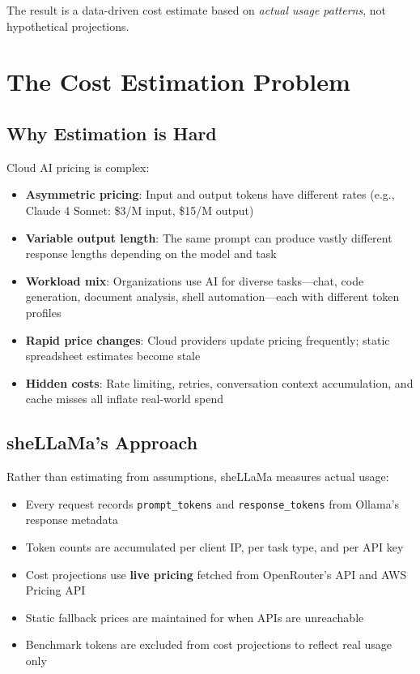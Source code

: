\documentclass[11pt,a4paper]{article}
\begin{document}
The result is a data-driven cost estimate based on \emph{actual usage patterns}, not hypothetical projections.

\section{The Cost Estimation Problem}

\subsection{Why Estimation is Hard}

Cloud AI pricing is complex:

\begin{itemize}
  \item \textbf{Asymmetric pricing}: Input and output tokens have different rates (e.g., Claude 4 Sonnet: \$3/M input, \$15/M output)
  \item \textbf{Variable output length}: The same prompt can produce vastly different response lengths depending on the model and task
  \item \textbf{Workload mix}: Organizations use AI for diverse tasks---chat, code generation, document analysis, shell automation---each with different token profiles
  \item \textbf{Rapid price changes}: Cloud providers update pricing frequently; static spreadsheet estimates become stale
  \item \textbf{Hidden costs}: Rate limiting, retries, conversation context accumulation, and cache misses all inflate real-world spend
\end{itemize}

\subsection{sheLLaMa's Approach}

Rather than estimating from assumptions, sheLLaMa measures actual usage:

\begin{itemize}
  \item Every request records \texttt{prompt\_tokens} and \texttt{response\_tokens} from Ollama's response metadata
  \item Token counts are accumulated per client IP, per task type, and per API key
  \item Cost projections use \textbf{live pricing} fetched from OpenRouter's API and AWS Pricing API
  \item Static fallback prices are maintained for when APIs are unreachable
  \item Benchmark tokens are excluded from cost projections to reflect real usage only
\end{itemize}
\end{document}
